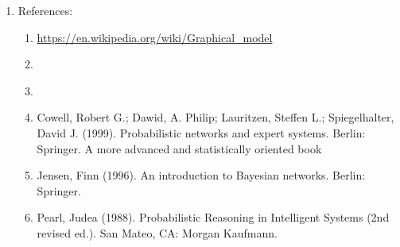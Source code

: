 \begin{enumerate}
\begin{enumerate}
\begin{enumerate}
		\end{enumerate}
	\item References: \vspace{-0.2cm}
		\begin{enumerate} \itemsep -2pt
		\item \url{https://en.wikipedia.org/wiki/Graphical_model}
		\item \cite{Barber2012}
		\item \cite{Bishop2006}
		\item Cowell, Robert G.; Dawid, A. Philip; Lauritzen, Steffen L.; Spiegelhalter, David J. (1999). Probabilistic networks and expert systems. Berlin: Springer. A more advanced and statistically oriented book
		\item Jensen, Finn (1996). An introduction to Bayesian networks. Berlin: Springer.
		\item Pearl, Judea (1988). Probabilistic Reasoning in Intelligent Systems (2nd revised ed.). San Mateo, CA: Morgan Kaufmann. 
		\end{enumerate}
	\end{enumerate}
\end{enumerate}





